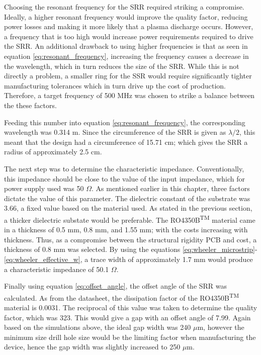 Choosing the resonant frequency for the SRR required striking a compromise. Ideally, a higher resonant frequency would improve the quality factor, reducing power losses and making it more likely that a plasma discharge occurs. However, a frequency that is too high would increase power requirements required to drive the SRR. An additional drawback to using higher frequencies is that as seen in equation \ref{eq:resonant_frequency}, increasing the frequency causes a decrease in the wavelength, which in turn reduces the size of the SRR. While this is not directly a problem, a smaller ring for the SSR would require significantly tighter manufacturing tolerances which in turn drive up the cost of production. Therefore, a target frequency of 500 MHz was chosen to strike a balance between the these factors. 

Feeding this number into equation \ref{eq:resonant_frequency}, the corresponding wavelength was 0.314 m. Since the circumference of the SRR is given as $\lambda/2$, this meant that the design had a circumference of 15.71 cm; which gives the SRR a radius of approximately 2.5 cm. 

The next step was to determine the characteristic impedance. Conventionally, this impedance should be close to the value of the input impedance, which for power supply used was 50 $\Omega$. As mentioned earlier in this chapter, three factors dictate the value of this parameter. The dielectric constant of the substrate was 3.66, a fixed value based on the material used. As stated in the previous section, a thicker dielectric substate would be preferable. The RO4350B\textsuperscript{TM} material came in a thickness of 0.5 mm, 0.8 mm, and 1.55 mm; with the costs increasing with thickness. Thus, as a compromise between the structural rigidity PCB and cost, a thickness of 0.8 mm was selected. By using the equations \ref{eq:wheeler_microstrip}-\ref{eq:wheeler_effective_w}, a trace width of approximately 1.7 mm would produce a characteristic impedance of 50.1 $\Omega$.

Finally using equation \ref{eq:offset_angle}, the offset angle of the SRR was calculated. As from the datasheet, the dissipation factor of the RO4350B\textsuperscript{TM} material is 0.0031. The reciprocal of this value was taken to determine the quality factor, which was 323. This would give a gap with an offset angle of 7.99. Again based on the simulations above, the ideal gap width was 240 $\mu$m, however the minimum size drill hole size would be the limiting factor when manufacturing the device, hence the gap width was slightly increased to 250 $\mu$m.

